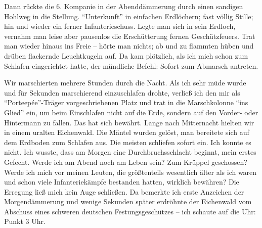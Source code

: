 Dann rückte die 6. Kompanie in der Abenddämmerung durch einen sandigen Hohlweg in die Stellung. \enquote{Unterkunft} in einfachen Erdlöchern; fast völlig Stille; hin und wieder ein ferner Infanterieschuss. Legte man sich in sein Erdloch, vernahm man leise aber pausenlos die Erschütterung fernen Geschützfeuers. Trat man wieder hinaus ins Freie -- hörte man nichts; ab und zu flammten hüben und drüben flackernde Leuchtkugeln auf. Da kam plötzlich, als ich mich schon zum Schlafen eingerichtet hatte, der mündliche Befehl: Sofort zum Abmarsch antreten.

Wir marschierten mehrere Stunden durch die Nacht. Als ich sehr müde wurde und für Sekunden marschierend einzuschlafen drohte, verließ ich den mir als \enquote{Porteepée}-Träger vorgeschriebenen Platz und trat in die Marschkolonne \enquote{ins Glied} ein, um beim Einschlafen nicht auf die Erde, sondern auf den Vorder- oder Hintermann zu fallen. Das hat sich bewährt. Lange nach Mitternacht hielten wir in einem uralten Eichenwald. Die Mäntel wurden gelöst, man bereitete sich auf dem Erdboden zum Schlafen aus. Die meisten schliefen sofort ein. Ich konnte es nicht. Ich wusste, dass am Morgen eine Durchbruchsschlacht beginnt, mein erstes Gefecht. Werde ich am Abend noch am Leben sein? Zum Krüppel geschossen? Werde ich mich vor meinen Leuten, die größtenteils wesentlich älter als ich waren und schon viele Infanteriekämpfe bestanden hatten, wirklich bewähren? Die Erregung ließ mich kein Auge schließen. Da bemerkte ich erste Anzeichen der Morgendämmerung und wenige Sekunden später erdröhnte der Eichenwald vom Abschuss eines schweren deutschen Festungsgeschützes -- ich schaute auf die Uhr: Punkt 3 Uhr.

